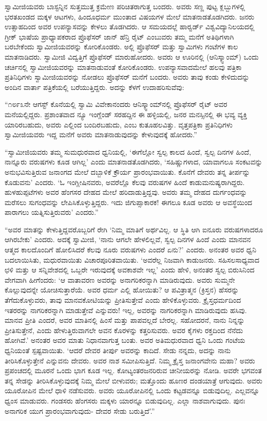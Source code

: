  ಸ್ವಾಮೀಜಿಯವರು ಬಾಸ್ಟನ್ನಿನ ಸುತ್ತಮುತ್ತ ಕ್ರಮೇಣ ಪರಿಚಿತರಾಗುತ್ತ ಬಂದರು. ಅವರು ಸಣ್ಣ ಪುಟ್ಟ ಕ್ಲಬ್ಬುಗಳಲ್ಲಿ ಭರತಖಂಡದ ಮಕ್ಕಳ ಆಟಗಳು, ಹಿಂದೂಧರ್ಮ ಮುಂತಾದ ವಿಷಯಗಳ ಮೇಲೆ ಮಾತನಾಡತೊಡಗಿದರು. ಜನರು ಉತ್ಸಾಹದಿಂದ ಅವರ ಉಪನ್ಯಾಸವನ್ನು ಕೇಳಲು ತೊಡಗಿದರು. ಆ ಸಮಯದಲ್ಲೆ ಹಾರ್‍ವರ್ಡ್ ವಿಶ್ವವಿದ್ಯಾನಿಲಯದಲ್ಲಿ ಗ್ರೀಕ್ ಭಾಷೆಯ ಪ್ರಾಧ್ಯಾಪಕರಾದ ಪ್ರೊಫೆಸರ್ ಜಾನ್ ಹೆನ್ರಿ ರೈಟ್ ಎಂಬುವರು ತಮ್ಮ ಮನೆಗೆ ಅತಿಥಿಗಳಾಗಿ ಬರಬೇಕೆಂದು ಸ್ವಾಮೀಜಿಯವರನ್ನು ಕೋರಿಕೊಂಡರು. ಅಲ್ಲಿ ಪ್ರೊಫೆಸರ್ ಮತ್ತು ಸ್ವಾಮಿಗಳು ಗಂಟೆಗಳ ಕಾಲ ಮಾತನಾಡಿದರು. ಸ್ವಾಮೀಜಿ ವಿದ್ವತ್ತಿಗೆ ಪ್ರೊಫೆಸರ್ ಮಾರುಹೋದರು. ಅವರು ಆ ಊರಿನಲ್ಲಿ (ಆನಿಸ್ಕ್ವಾಂಮ್) ಒಂದು ಚರ್ಚಿನಲ್ಲಿ ಸ್ವಾಮೀಜಿಯವರನ್ನು ಮಾತನಾಡುವಂತೆ ಕೋರಿಕೊಂಡರು. ಉಪನ್ಯಾಸವಾದಮೇಲೆ ಹಲವು ಪತ್ರಿಕಾ ಪ್ರತಿನಿಧಿಗಳು ಸ್ವಾಮೀಜಿಯವರನ್ನು ನೋಡಲು ಪ್ರೊಫೆಸರ್ ಮನೆಗೆ ಬಂದರು. ಅವರು ತಾವು ಕಂಡು ಕೇಳಿದುದನ್ನು ಅಂದಿನ ವಾರ್ತಾ ಪತ್ರಿಕೆಯಲ್ಲಿ ಬರೆಯುತ್ತಿದ್ದರು. ಅದನ್ನು ಕೆಳಗೆ ಉದಾಹರಿಸುವೆವು: 

 “೧೮೯೩ನೇ ಆಗಸ್ಟ್ ಕೊನೆಯಲ್ಲಿ ಸ್ವಾಮಿ ವಿವೇಕಾನಂದರು ಆನಿಸ್ಕ್ವಾಂಮ್‍ನಲ್ಲಿ ಪ್ರೊಫೆಸರ್ ರೈಟ್ ಅವರ ಮನೆಯಲ್ಲಿದ್ದರು. ಪ್ರಶಾಂತವಾದ ನ್ಯೂ ಇಂಗ್ಲೆಂಡ್ ಸರಹದ್ದಿನ ಈ ಹಳ್ಳಿಯಲ್ಲಿ, ಜನರ ಮನಸ್ಸಿನಲ್ಲಿ ಈ ಭವ್ಯ ವ್ಯಕ್ತಿ ಯಾರಿರಬಹುದು, ಅವರು ಎಲ್ಲಿಂದ ಬಂದಿರಬಹುದು, ಎಂಬ ಕುತೂಹಲವಿತ್ತು. ವೃತ್ತಪತ್ರಿಕಾ ಪ್ರತಿನಿಧಿಗಳು ಸ್ವಾಮೀಜಿಯವರು ಇದ್ದ ಮನೆಗೆ ಅವರು ಮಾತನಾಡುವುದನ್ನು ಕೇಳುವುದಕ್ಕೆ ಹೋದರು.” 

 “ಸ್ವಾಮೀಜಿಯವರು ತಮ್ಮ ಸುಮಧುರವಾದ ಧ್ವನಿಯಲ್ಲಿ, ‘ಈಗೆಲ್ಲೋ ಸ್ವಲ್ಪ ಕಾಲದ ಹಿಂದೆ, ಸ್ವಲ್ಪ ದಿನಗಳ ಹಿಂದೆ, ನಾನ್ನೂರು ವರುಷಗಳು ಕೂಡ ಆಗಿಲ್ಲ’ ಎಂದು ಮಾತನಾಡತೊಡಗಿದರು, ‘ಸಹಿಷ್ಣುಗಳಾದ, ಯಾವಾಗಲೂ ಸಂಕಟವನ್ನು ಅನುಭವಿಸುತ್ತಿರುವ ಜನಾಂಗದ ಮೇಲೆ ದಬ್ಬಾಳಿಕೆ ಕ್ರೌರ್ಯ ಪ್ರಾರಂಭವಾಯಿತು. ಕೊನೆಗೆ ದೇವರು ತನ್ನ ತೀರ್ಪನ್ನು ಕೊಡುವನು’ ಎಂದರು. ‘ಓ ಇಂಗ್ಲೀಷಿನವರು, ಅವರೆಲ್ಲೊ ಕೆಲವು ವರುಷಗಳ ಹಿಂದೆ ಕಾಡುಮನುಷ್ಯರಾಗಿದ್ದರು. ಹುಳಹುಪ್ಪಟೆಗಳು ಅವರ ಹೆಂಗಸರ ದೇಹದ ಮೇಲೆ ಹರಿದಾಡುತ್ತಿದ್ದವು. ಅವರು ತಮ್ಮ ದೇಹದ ದುರ್ಗಂಧವನ್ನು ಮರೆಸಲು ಸುಗಂಧವನ್ನು ಲೇಪಿಸಿಕೊಳ್ಳುತ್ತಿದ್ದರು. ಇದು ಜಿಗುಪ್ಸಾಕಾರಕ! ಈಗಲೂ ಕೂಡ ಅವರು ಆ ಅವಸ್ಥೆಯಿಂದ ಪಾರಾಗಲು ಯತ್ನಿಸುತ್ತಿರುವರು’ ಎಂದರು.” 

 “ಅವರ ಮಾತನ್ನು ಕೇಳುತ್ತಿದ್ದವರೊಬ್ಬರಿಗೆ ರೇಗಿ ‘ನಿಮ್ಮ ಮಾತಿಗೆ ಅರ್ಥವಿಲ್ಲ. ಆ ಸ್ಥಿತಿ ಆಗಿ ಐನೂರು ವರುಷಗಳಾದರೂ ಆಗಿರಬೇಕು’ ಎಂದರು. ಅದಕ್ಕೆ ಸ್ವಾಮೀಜಿ, ‘ನಾನು ಆಗಲೇ ಹೇಳಲಿಲ್ಲವೆ, ಸ್ವಲ್ಪ ದಿನಗಳ ಹಿಂದೆ ಎಂದು ಮಾನವನ ಆತ್ಮದ ಕಾಲದೊಂದಿಗೆ ಹೋಲಿಸಿದರೆ ಕೆಲವು ನೂರು ವರುಷಗಳು ಎಂದರೆ ಏನು?’ ಎಂದರು. ಅನಂತರ ಅವರ ಧ್ವನಿ ಬದಲಾಯಿಸಿತು, ಮಧುರವಾಯಿತು ವಿಚಾರಪೂರಿತವಾಯಿತು. ‘ಅವರೆಲ್ಲ ನಿಜವಾಗಿ ಕಾಡುಜನರು. ಸಹಿಸಲಸಾಧ್ಯವಾದ ಛಳಿ ಮತ್ತು ಆ ಸನ್ನಿವೇಶದಲ್ಲಿ ಒಬ್ಬರೇ ಇರುವುದಕ್ಕೆ ಅವಕಾಶವೇ ಇಲ್ಲ’ ಎಂದು ಹೇಳಿ, ಅನಂತರ ಸ್ವಲ್ಪ ಬಿರುಸಿನಿಂದ ವೇಗವಾಗಿ ಹೀಗೆಂದರು: ‘ಆ ವಾತಾವರಣ ಅವರನ್ನು ಅನಾಗರಿಕರನ್ನಾಗಿ ಮಾಡಿರುವುದು. ಅವರು ಸುಮ್ಮನೇ ಕೊಲ್ಲುವುದನ್ನೇ ಯೋಚಿಸುತ್ತಾರೆಯೆ. ಅವರ ಧರ್ಮ ಎಲ್ಲಿ ಹೋಯಿತು? ಆ ಪವಿತ್ರಾತ್ಮನ (ಕ್ರಿಸ್ತನ) ಹೆಸರನ್ನು ತೆಗೆದುಕೊಳ್ಳುವರು, ತಾವು ಮಾನವಕೋಟಿಯನ್ನು ಪ್ರೀತಿಸುತ್ತೇವೆ ಎಂದು ಹೇಳಿಕೊಳ್ಳುವರು. ಕ್ರೈಸ್ತಧರ್ಮದಿಂದ ಇತರರನ್ನು ನಾಗರಿಕರನ್ನಾಗಿ ಮಾಡುತ್ತೇವೆ ಎನ್ನುವರು! ಇಲ್ಲ, ಅವರನ್ನು ನಾಗರಿಕರನ್ನಾಗಿ ಮಾಡಿರುವುದು ಹಸಿವು. ಮಾನವ ಪ್ರೀತಿ ಎಂದರೆ, ಅವರ ಮಾತಿನಲ್ಲಿ ಹಿಂಸೆ ಮತ್ತು ಪಾಪವಲ್ಲದೆ ಬೇರಲ್ಲ. ಸಹೋದರನೆ, ನಾನು ನಿನ್ನನ್ನು ಪ್ರೀತಿಸುತ್ತೇನೆ, ಎಂದು ಹೇಳುತ್ತಿರುವಾಗಲೇ ಅವನ ಕೊರಳನ್ನು ಕತ್ತರಿಸುವರು. ಅವರ ಕೈಗಳು ರಕ್ತದಿಂದ ನೆನೆದು ಹೋಗಿವೆ.’ ಅನಂತರ ಅವರ ಮಾತು ನಿಧಾನವಾಗುತ್ತ ಬಂತು. ಅವರ ಅತಿಮಧುರವಾದ ಧ್ವನಿ ಒಂದು ಗಂಟೆಯ ಧ್ವನಿಯಂತೆ ಸ್ಪಷ್ಟವಾಯಿತು. ‘ಆದರೆ ದೇವರ ತೀರ್ಪು ಅವರನ್ನು ಕಾದಿದೆ. ಸೇಡು ನನ್ನದು, ಅದನ್ನು ನಾನು ತೀರಿಸಿಕೊಳ್ಳುತ್ತೇನೆ ಎನ್ನುವನು ದೇವರು. ಅವರ ನಾಶ ಸಮೀಪಿಸುತ್ತಿದೆ. ನಿಮ್ಮ ಕ್ರೈಸ್ತ ಜನಾಂಗವೇನು ಮಹಾ? ಅವರು ಪ್ರಪಂಚದಲ್ಲಿ ಮೂರನೆ ಒಂದು ಭಾಗ ಕೂಡ ಇಲ್ಲ. ಕೋಟ್ಯಂತರ\break ಜನರಿರುವ ಚೀನೀಯರನ್ನು ನೋಡಿ. ಅವರೇ ಭಗವಂತ ತನ್ನ ಸೇಡನ್ನು ತೀರಿಸಿಕೊಳ್ಳುವುದಕ್ಕೆ ನಿಮ್ಮ ಮೇಲೆ ಬೀಳುವರು; ಮತ್ತೊಂದು ಹೂಣರ ದಂಡಯಾತ್ರೆ ಆಗುವುದು. ಅವರು ಯೂರೋಪಿನ ಮೇಲೆ ಧಾಳಿ ನಡೆಸುವರು. ಅವರು ಯೂರೋಪಿನಲ್ಲಿ ಒಂದು ಕಟ್ಟಡವನ್ನೂ ಬಿಡುವುದಿಲ್ಲ. ಎಲ್ಲವನ್ನೂ ಧ್ವಂಸ ಮಾಡುವರು. ಗಂಡಸರು ಹೆಂಗಸರು ಮಕ್ಕಳು ಯಾರನ್ನೂ ಬಿಡುವುದಿಲ್ಲ. ಎಲ್ಲಾ ನಾಶವಾಗುವುದು. ಪುನಃ ಅನಾಗರಿಕ ಯುಗ ಪ್ರಾರಂಭವಾಗುವುದು- ದೇವರ ಸೇಡು ಬರುತ್ತಿದೆ’.” 

